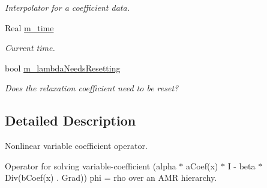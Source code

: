 \begin{DoxyCompactItemize}
\begin{DoxyCompactList}\small\item\em Interpolator for a coefficient data. \end{DoxyCompactList}\item 
\hypertarget{class_a_m_r_non_linear_v_c_op_a4039e4ab4ab8b19cb7177ec2566dcc29}{Real \hyperlink{class_a_m_r_non_linear_v_c_op_a4039e4ab4ab8b19cb7177ec2566dcc29}{m\-\_\-time}}\label{class_a_m_r_non_linear_v_c_op_a4039e4ab4ab8b19cb7177ec2566dcc29}

\begin{DoxyCompactList}\small\item\em Current time. \end{DoxyCompactList}\item 
\hypertarget{class_a_m_r_non_linear_v_c_op_a23d2e2dc92ec1790af8e661b64ebe7d8}{bool \hyperlink{class_a_m_r_non_linear_v_c_op_a23d2e2dc92ec1790af8e661b64ebe7d8}{m\-\_\-lambda\-Needs\-Resetting}}\label{class_a_m_r_non_linear_v_c_op_a23d2e2dc92ec1790af8e661b64ebe7d8}

\begin{DoxyCompactList}\small\item\em Does the relaxation coefficient need to be reset? \end{DoxyCompactList}\end{DoxyCompactItemize}


\subsection{Detailed Description}
Nonlinear variable coefficient operator. 

Operator for solving variable-\/coefficient (alpha $\ast$ a\-Coef(x) $\ast$ I -\/ beta $\ast$ Div(b\-Coef(x) . Grad)) phi = rho over an A\-M\-R hierarchy. 


